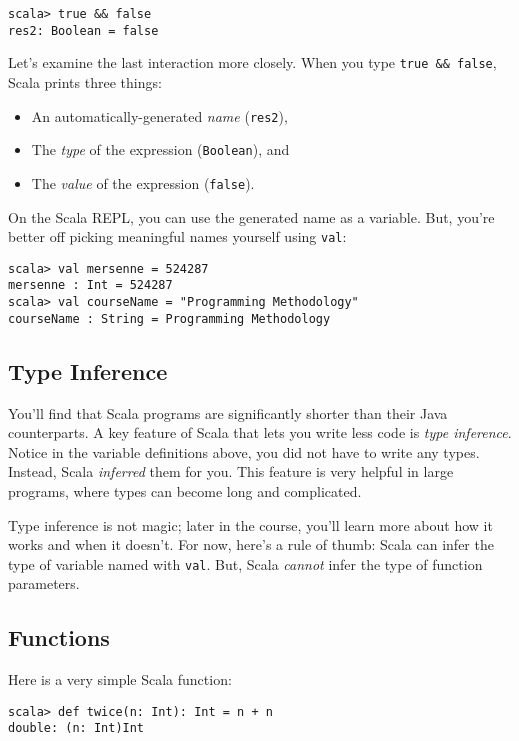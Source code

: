 \documentclass[9pt]{extbook}
\begin{document}
\begin{lstlisting}
scala> true && false
res2: Boolean = false
\end{lstlisting}

\lstset{language=scala}
Let's examine the last interaction more closely. When you type \lstinline|true && false|,
Scala prints three things:
%
\begin{itemize}
\item An automatically-generated \emph{name} (\lstinline|res2|),
\item The \emph{type} of the expression (\lstinline|Boolean|), and
\item The \emph{value} of the expression (\lstinline|false|).
\end{itemize}

On the Scala REPL, you can use the generated name as a variable. But, you're
better off picking meaningful names yourself using \lstinline|val|:
\lstset{language=console}
\begin{lstlisting}
scala> val mersenne = 524287
mersenne : Int = 524287
scala> val courseName = "Programming Methodology"
courseName : String = Programming Methodology
\end{lstlisting}

\subsection{Type Inference}

You'll find that Scala programs are significantly shorter than their Java
counterparts. A key feature of Scala that lets you write less code is \emph{type
inference}. Notice in the variable definitions above, you did not have to write
any types. Instead, Scala \emph{inferred} them for you. This feature is very helpful
in large programs, where types can become long and complicated.

Type inference is not magic; later in the course, you'll learn more about how it
works and when it doesn't. For now, here's a rule of thumb: Scala can infer the
type of variable named with \verb|val|. But, Scala \emph{cannot} infer the type of
function parameters.

\subsection{Functions}

Here is a very simple Scala function:

\begin{lstlisting}
scala> def twice(n: Int): Int = n + n
double: (n: Int)Int
\end{lstlisting}
\end{document}
